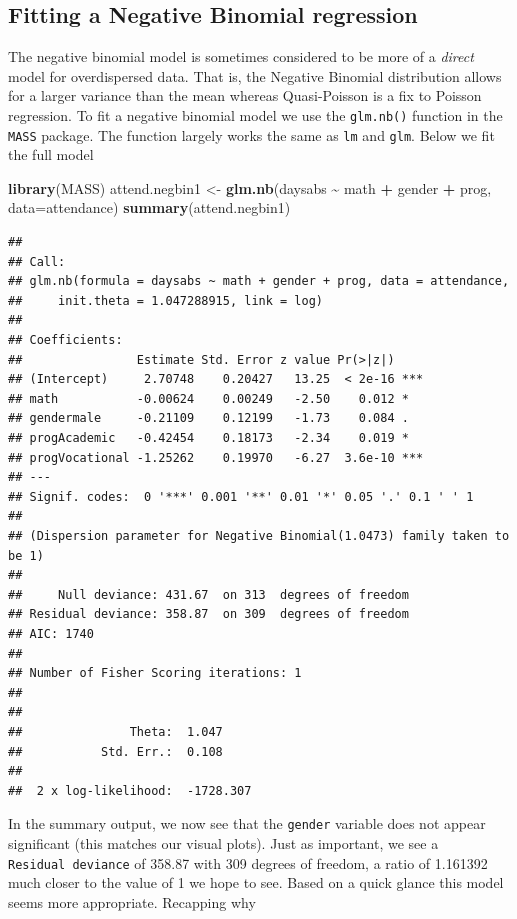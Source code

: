 \documentclass[
]{book}
\newenvironment{Shaded}{\begin{snugshade}}{\end{snugshade}}
\newcommand{\AttributeTok}[1]{\textcolor[rgb]{0.13,0.29,0.53}{#1}}
\newcommand{\FunctionTok}[1]{\textcolor[rgb]{0.13,0.29,0.53}{\textbf{#1}}}
\newcommand{\NormalTok}[1]{#1}
\newcommand{\OtherTok}[1]{\textcolor[rgb]{0.56,0.35,0.01}{#1}}
\newcommand{\SpecialCharTok}[1]{\textcolor[rgb]{0.81,0.36,0.00}{\textbf{#1}}}
\begin{document}
\hypertarget{fitting-a-negative-binomial-regression}{%
\subsection{Fitting a Negative Binomial regression}\label{fitting-a-negative-binomial-regression}}

The negative binomial model is sometimes considered to be more of a \emph{direct} model for overdispersed data. That is, the Negative Binomial distribution allows for a larger variance than the mean whereas Quasi-Poisson is a fix to Poisson regression.
To fit a negative binomial model we use the \texttt{glm.nb()} function in the \texttt{MASS} package. The function largely works the same as \texttt{lm} and \texttt{glm}. Below we fit the full model

\begin{Shaded}
\begin{Highlighting}[]
\FunctionTok{library}\NormalTok{(MASS)}
\NormalTok{attend.negbin1 }\OtherTok{\textless{}{-}} \FunctionTok{glm.nb}\NormalTok{(daysabs }\SpecialCharTok{\textasciitilde{}}\NormalTok{ math }\SpecialCharTok{+}\NormalTok{ gender }\SpecialCharTok{+}\NormalTok{ prog, }\AttributeTok{data=}\NormalTok{attendance)}
\FunctionTok{summary}\NormalTok{(attend.negbin1)}
\end{Highlighting}
\end{Shaded}

\begin{verbatim}
## 
## Call:
## glm.nb(formula = daysabs ~ math + gender + prog, data = attendance, 
##     init.theta = 1.047288915, link = log)
## 
## Coefficients:
##                Estimate Std. Error z value Pr(>|z|)    
## (Intercept)     2.70748    0.20427   13.25  < 2e-16 ***
## math           -0.00624    0.00249   -2.50    0.012 *  
## gendermale     -0.21109    0.12199   -1.73    0.084 .  
## progAcademic   -0.42454    0.18173   -2.34    0.019 *  
## progVocational -1.25262    0.19970   -6.27  3.6e-10 ***
## ---
## Signif. codes:  0 '***' 0.001 '**' 0.01 '*' 0.05 '.' 0.1 ' ' 1
## 
## (Dispersion parameter for Negative Binomial(1.0473) family taken to be 1)
## 
##     Null deviance: 431.67  on 313  degrees of freedom
## Residual deviance: 358.87  on 309  degrees of freedom
## AIC: 1740
## 
## Number of Fisher Scoring iterations: 1
## 
## 
##               Theta:  1.047 
##           Std. Err.:  0.108 
## 
##  2 x log-likelihood:  -1728.307
\end{verbatim}

In the summary output, we now see that the \texttt{gender} variable does not appear significant (this matches our visual plots). Just as important, we see a \texttt{Residual\ deviance} of 358.87 with 309 degrees of freedom, a ratio of 1.161392 much closer to the value of 1 we hope to see. Based on a quick glance this model seems more appropriate. Recapping why
\end{document}
